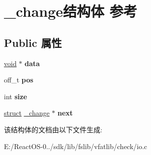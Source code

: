 \hypertarget{struct__change}{}\section{\+\_\+change结构体 参考}
\label{struct__change}
\subsection*{Public 属性}
\begin{DoxyCompactItemize}
\item 
\mbox{\label{struct__change_af1bcfeb828f14c52ef59cc2cde26f3f8}} 
\hyperlink{interfacevoid}{void} $\ast$ {\bfseries data}
\item 
\mbox{\label{struct__change_ab271951fed43dfbab0c16cd8a16e1fa0}} 
off\+\_\+t {\bfseries pos}
\item 
\mbox{\label{struct__change_a30850adb1df25483bedb9d31d598f2d8}} 
int {\bfseries size}
\item 
\mbox{\label{struct__change_adb8f515763b265fb997fc6d27ffd4008}} 
\hyperlink{interfacestruct}{struct} \hyperlink{struct__change}{\+\_\+change} $\ast$ {\bfseries next}
\end{DoxyCompactItemize}


该结构体的文档由以下文件生成\+:\begin{DoxyCompactItemize}
\item 
E\+:/\+React\+O\+S-\/0../sdk/lib/fslib/vfatlib/check/io.\+c\end{DoxyCompactItemize}
